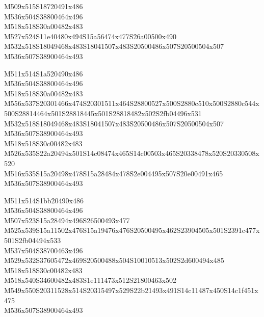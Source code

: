 \documentclass{article}
\begin{document}
\begin{multicols}{5}
\begin{center}

M509x515S18720491x486 %
\\M536x504S38800464x496 %
\\M518x518S30a00482x483 %
\\M527x524S11e40480x494S15a56474x477S26a00500x490 %
\\M532x518S18049468x483S18041507x483S20500486x507S20500504x507 %
\\M536x507S38900464x493 %
\vfil
\columnbreak

M511x514S1a520490x486 %
\\M536x504S38800464x496 %
\\M518x518S30a00482x483 %
\\M556x537S20301466x474S20301511x464S28800527x500S2880c510x500S2880c544x500S28814464x501S28818445x501S28818482x502S2fb04496x531 %
\\M532x518S18049468x483S18041507x483S20500486x507S20500504x507 %
\\M536x507S38900464x493 %
\\M518x518S30c00482x483 %
\\M526x535S22a20494x501S14c08474x465S14c00503x465S20338478x520S20330508x520 %
\\M516x535S15a20498x478S15a28484x478S2e004495x507S20e00491x465 %
\\M536x507S38900464x493 %
\vfil
\columnbreak

M511x514S1bb20490x486 %
\\M536x504S38800464x496 %
\\M507x523S15a28494x496S26500493x477 %
\\M525x539S15a11502x476S15a19476x476S20500495x462S23904505x501S2391c477x501S2fb04494x533 %
\\M537x504S38700463x496 %
\\M529x532S37605472x469S20500488x504S10010513x502S2d600494x485 %
\\M518x518S30c00482x483 %
\\M518x540S34600482x483S1e111473x512S21800463x502 %
\\M549x550S20311528x514S20315497x529S22b21493x491S14c11487x450S14c1f451x475 %
\\M536x507S38900464x493 %
\vfil
\columnbreak


\end{center}
\end{multicols}
\end{document}
